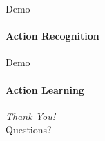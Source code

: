 \documentclass[aspectratio=169, xcolor=dvipsnames]{beamer}
\begin{document}
\begin{frame}{Demo}
      \framesubtitle{Action Recognition}%
      
\end{frame}

\begin{frame}{Demo}
      \framesubtitle{Action Learning}%
      
\end{frame}

\begin{frame}
      \vspace{1.25cm}
      \centering
      \Huge
      \emph{Thank You!}\\
      \vspace{0.25cm}
      \large
      Questions?
\end{frame}
\end{document}
